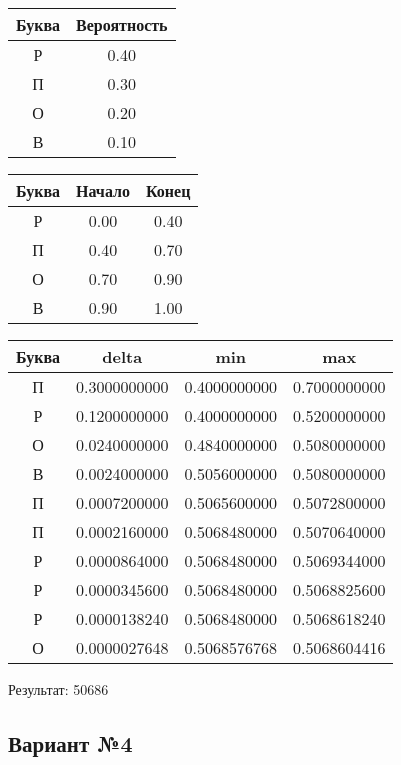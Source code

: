 \documentclass[a4paper, 12pt]{article}
\begin{document}
\begin{center}
 \begin{tabular}{ |c|c| } 
  \hline
     Буква & Вероятность \\ \hline
Р & 0.40\\\hline
П & 0.30\\\hline
О & 0.20\\\hline
В & 0.10
\\ \hline \end{tabular}
\end{center}
\begin{center}
 \begin{tabular}{ |c|c|c| } 
  \hline
     Буква & Начало & Конец \\ \hline
Р & 0.00 & 0.40\\\hline
П & 0.40 & 0.70\\\hline
О & 0.70 & 0.90\\\hline
В & 0.90 & 1.00
\\ \hline \end{tabular}
\end{center}
\begin{center}
 \begin{tabular}{ |c|c|c|c| } 
  \hline
     Буква & delta & min & max \\ \hline
П & 0.3000000000 & 0.4000000000 & 0.7000000000\\\hline
Р & 0.1200000000 & 0.4000000000 & 0.5200000000\\\hline
О & 0.0240000000 & 0.4840000000 & 0.5080000000\\\hline
В & 0.0024000000 & 0.5056000000 & 0.5080000000\\\hline
П & 0.0007200000 & 0.5065600000 & 0.5072800000\\\hline
П & 0.0002160000 & 0.5068480000 & 0.5070640000\\\hline
Р & 0.0000864000 & 0.5068480000 & 0.5069344000\\\hline
Р & 0.0000345600 & 0.5068480000 & 0.5068825600\\\hline
Р & 0.0000138240 & 0.5068480000 & 0.5068618240\\\hline
О & 0.0000027648 & 0.5068576768 & 0.5068604416
\\ \hline \end{tabular}
\end{center}
Результат: 50686
\pagebreak
\subsection{Вариант №4}
\end{document}
